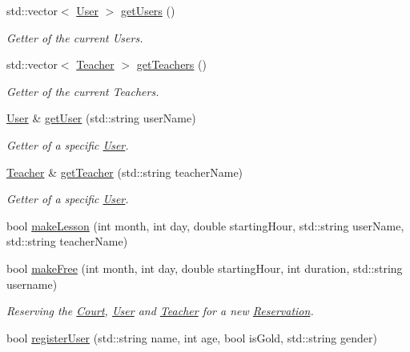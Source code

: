 \begin{DoxyCompactItemize}
std\+::vector$<$ \mbox{\hyperlink{class_user}{User}} $>$ \mbox{\hyperlink{class_company_a6f6a3dbf24278f5e1395d123d5812f33}{get\+Users}} ()
\begin{DoxyCompactList}\small\item\em Getter of the current Users. \end{DoxyCompactList}\item 
std\+::vector$<$ \mbox{\hyperlink{class_teacher}{Teacher}} $>$ \mbox{\hyperlink{class_company_a000159ce012318a6edf0335447ad8bde}{get\+Teachers}} ()
\begin{DoxyCompactList}\small\item\em Getter of the current Teachers. \end{DoxyCompactList}\item 
\mbox{\hyperlink{class_user}{User}} \& \mbox{\hyperlink{class_company_a314cbc50e394b65f3b07670855029eef}{get\+User}} (std\+::string user\+Name)
\begin{DoxyCompactList}\small\item\em Getter of a specific \mbox{\hyperlink{class_user}{User}}. \end{DoxyCompactList}\item 
\mbox{\hyperlink{class_teacher}{Teacher}} \& \mbox{\hyperlink{class_company_a7867ccfc2961810389f118feb827e63e}{get\+Teacher}} (std\+::string teacher\+Name)
\begin{DoxyCompactList}\small\item\em Getter of a specific \mbox{\hyperlink{class_user}{User}}. \end{DoxyCompactList}\item 
bool \mbox{\hyperlink{class_company_a0ab3ff0ea443cc20fd1ea99e5d8725c9}{make\+Lesson}} (int month, int day, double starting\+Hour, std\+::string user\+Name, std\+::string teacher\+Name)
\item 
bool \mbox{\hyperlink{class_company_a56fa75dd66690eae0853a3f3278220e3}{make\+Free}} (int month, int day, double starting\+Hour, int duration, std\+::string username)
\begin{DoxyCompactList}\small\item\em Reserving the \mbox{\hyperlink{class_court}{Court}}, \mbox{\hyperlink{class_user}{User}} and \mbox{\hyperlink{class_teacher}{Teacher}} for a new \mbox{\hyperlink{class_reservation}{Reservation}}. \end{DoxyCompactList}\item 
bool \mbox{\hyperlink{class_company_a94383e957bfa622949f1e577a325a1d5}{register\+User}} (std\+::string name, int age, bool is\+Gold, std\+::string gender)

\end{DoxyCompactItemize}
